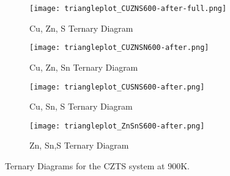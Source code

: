 \begin{figure}[ht]
\centering
\begin{subfigure}{70mm}
  \centering
    \texttt{[image: triangleplot\_CUZNS600-after-full.png]}
    \caption{Cu, Zn, S Ternary Diagram}
    \label{fig:CuZnS900K}
\end{subfigure}%
\begin{subfigure}{70mm}
 \centering
    \texttt{[image: triangleplot\_CUZNSN600-after.png]}
    \caption{Cu, Zn, Sn Ternary Diagram}
    \label{fig:CuZnSn900K}
\end{subfigure}
\begin{subfigure}{70mm}
 \centering
    \texttt{[image: triangleplot\_CUSNS600-after.png]}
    \caption{Cu, Sn, S Ternary Diagram}
    \label{fig:CuSnS900K}
\end{subfigure}
\begin{subfigure}{70mm}
 \centering
    \texttt{[image: triangleplot\_ZnSnS600-after.png]}
    \caption{Zn, Sn,S Ternary Diagram}
    \label{fig:ZnSnS900K}
\end{subfigure}
\caption{Ternary Diagrams for the CZTS system at 900K.}
\label{fig:900KTPD}
\end{figure}